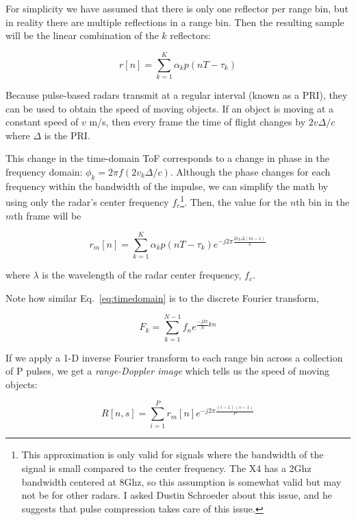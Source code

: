 \documentclass[12pt]{article}
\begin{document}
For simplicity we have assumed that there is only one reflector per
range bin, but in reality there are multiple reflections in a range
bin. Then the resulting sample will be the linear combination of the
$k$ reflectors:

\begin{equation}
r[n] = \sum\limits_{k=1}^K \alpha_k p(nT - \tau_k)  
\end{equation}

Because pulse-based radars transmit at a regular interval (known as a
PRI), they can be used to obtain the speed of moving objects. If an
object is moving at a constant speed of $v$ m/s, then every frame the
time of flight changes by $2v\Delta/c$ where $\Delta$ is the PRI.

This change in the time-domain ToF corresponds to a change in phase in
the frequency domain: $\phi_k = 2\pi f (2v_k\Delta/c)$. Although the
phase changes for each frequency within the bandwidth of the impulse,
we can simplify the math by using only the radar's center frequency
$f_c$\footnote{This approximation is only valid for signals where the
  bandwidth of the signal is small compared to the center
  frequency. The X4 has a 2Ghz bandwidth centered at 8Ghz, so this
  assumption is somewhat valid but may not be for other radars. I
  asked Dustin Schroeder about this issue, and he suggests that pulse
  compression takes care of this issue.}. Then, the value for the
$n$th bin in the $m$th frame will be


\begin{equation}
r_m[n] =  \sum\limits_{k=1}^K \alpha_k p(nT - \tau_k)e^{-j2\pi  \frac{2 v_k \Delta(m-1)}{\lambda}}  
\label{eq:timedomain}
\end{equation}

where $\lambda$ is the wavelength of the radar center frequency,
$f_c$.

Note how similar Eq.~\ref{eq:timedomain} is to the discrete Fourier transform,

\begin{equation}
F_k = \sum\limits_{k=1}^{N-1} f_n e^{\frac{-j2\pi}{N}kn}
\end{equation}

If we apply a 1-D inverse Fourier transform to each range bin across a
collection of P pulses, we get a \emph{range-Doppler image} which
tells us the speed of moving objects:

\begin{equation}
R[n,s] = \sum\limits_{i=1}^{P} r_m[n] e^{-j2\pi\frac{(i-1)(s-1)}{P}}
\label{eq:rangedopp}
\end{equation}
\end{document}
